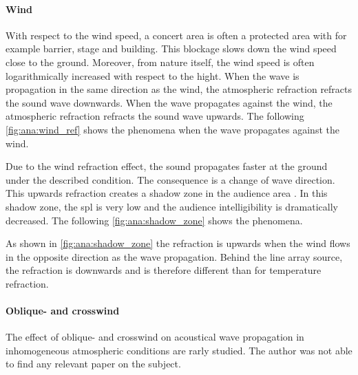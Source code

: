 \paragraph{Wind} With respect to the wind speed, a concert area is often a protected area with for example barrier, stage and building. This blockage slows down the wind speed close to the ground. Moreover, from nature itself, the wind speed is often logarithmically increased with respect to the hight. When the wave is propagation in the same direction as the wind, the atmospheric refraction refracts the sound wave downwards. When the wave propagates against the wind, the atmospheric refraction refracts the sound wave upwards. The following \autoref{fig:ana:wind_ref} shows the phenomena when the wave propagates against the wind.


Due to the wind refraction effect, the sound propagates faster at the ground under the described condition. The consequence is a change of wave direction. This upwards refraction creates a shadow zone in the audience area \citep{asmos_acous_2016}. In this shadow zone, the \gls{spl} is very low and the audience intelligibility is dramatically decreased. The following \autoref{fig:ana:shadow_zone} shows the phenomena.



As shown in \autoref{fig:ana:shadow_zone} the refraction is upwards when the wind flows in the opposite direction as the wave propagation. Behind the line array source, the refraction is downwards and is therefore different than for temperature refraction.

\paragraph{Oblique- and crosswind} The effect of oblique- and crosswind on acoustical wave propagation in inhomogeneous atmospheric conditions are rarly studied.  The author was not able to find any relevant paper on the subject.

